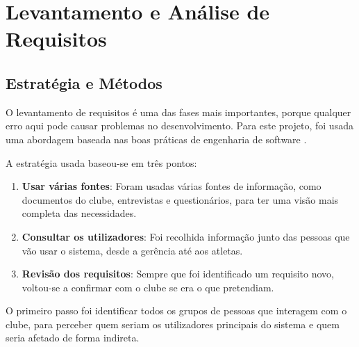 \chapter{Levantamento e Análise de Requisitos}\label{chap:analise_requisitos}

\section{Estratégia e Métodos}\label{sec:rel_estrategia}

O levantamento de requisitos é uma das fases mais importantes, porque qualquer erro aqui pode causar problemas no desenvolvimento. Para este projeto, foi usada uma abordagem baseada nas boas práticas de engenharia de software \cite{sommerville2015}.

A estratégia usada baseou-se em três pontos:
\begin{enumerate}
    \item \textbf{Usar várias fontes}: Foram usadas várias fontes de informação, como documentos do clube, entrevistas e questionários, para ter uma visão mais completa das necessidades.
    \item \textbf{Consultar os utilizadores}: Foi recolhida informação junto das pessoas que vão usar o sistema, desde a gerência até aos atletas.
    \item \textbf{Revisão dos requisitos}: Sempre que foi identificado um requisito novo, voltou-se a confirmar com o clube se era o que pretendiam.
\end{enumerate}

O primeiro passo foi identificar todos os grupos de pessoas que interagem com o clube, para perceber quem seriam os utilizadores principais do sistema e quem seria afetado de forma indireta.

